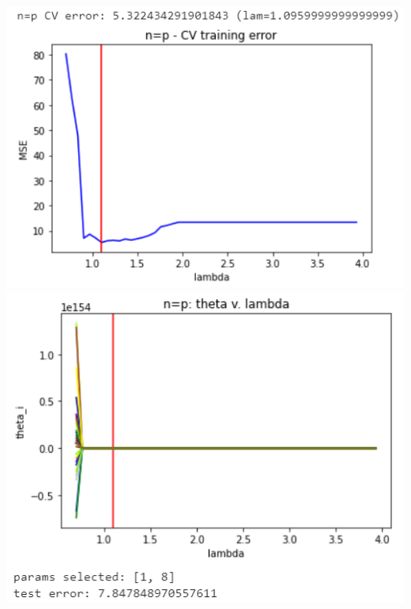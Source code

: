 \documentclass[11pt]{article}
\begin{document}
\begin{center}
\includegraphics[scale=0.7]{charts/ridge_q_ortho_n_eq_p_err.PNG}
\includegraphics[scale=0.7]{charts/ridge_q_ortho_n_eq_p_thetas.PNG}


\end{center}
\end{document}
